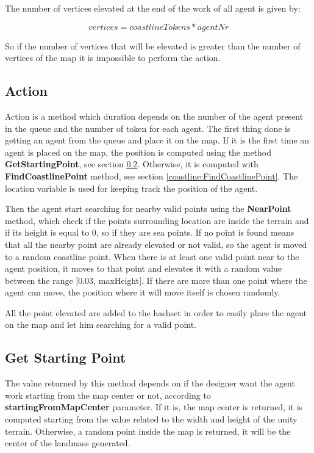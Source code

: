\documentclass[12pt]{article}
\begin{document}
    The number of vertices elevated at the end of the work of all agent is given by:

    \begin{equation}
        vertices = coastlineTokens * agentNr
    \end{equation}

    \noindent
    So if the number of vertices that will be elevated is greater than the number of vertices of the map it is impossible to perform the action.

    \subsection{Action}
    Action is a method which duration depends on the number of the agent present in the queue and the number of token for each agent. The first thing done is getting an agent
    from the queue and place it on the map. If it is the first time an agent is placed on the map, the position is computed using the method \textbf{GetStartingPoint}, see 
    section \ref{coastline:StartingPoint}. Otherwise, it is computed with \textbf{FindCoastlinePoint} method, see section \ref{coastline:FindCoastlinePoint}. The location variable is used for keeping
    track the position of the agent.

    Then the agent start searching for nearby valid points using the \textbf{NearPoint} method, which check if the points surrounding location are inside the terrain and if its
    height is equal to 0, so if they are sea points. If no point is found means that all the nearby point are already elevated or not valid,
    so the agent is moved to a random coastline point. When there is at least one valid point near to the agent position, it moves to that point and elevates it with a random
    value between the range [0.03, maxHeight]. If there are more than one point where the agent can move, the position where it will move itself is chosen randomly.

    All the point elevated are added to the hashset in order to easily place the agent on the map and let him searching for a valid point.

    \subsection{Get Starting Point} \label{coastline:StartingPoint}
    The value returned by this method depends on if the designer want the agent work starting from the map center or not, according to \textbf{startingFromMapCenter}
    parameter. If it is, the map center is returned, it is computed starting from the value related to the width and height of the unity terrain. Otherwise, a random
    point inside the map is returned, it will be the center of the landmass generated.
\end{document}
